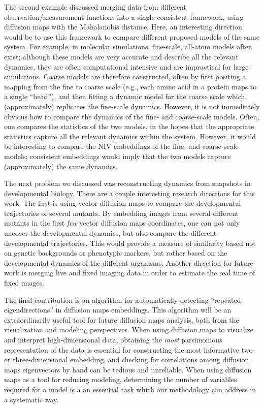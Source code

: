 The second example discussed merging data from different observation/measurement functions into a single consistent framework, using diffusion maps with the Mahalanobis distance. 
%
Here, an interesting direction would be to use this framework to compare different proposed models of the same system. 
%
For example, in molecular simulations, fine-scale, all-atom models often exist; although these models are very accurate and describe all the relevant dynamics, they are often computational intensive and are impractical for large simulations. 
%
Coarse models are therefore constructed, often by first positing a mapping from the fine to coarse scale (e.g., each amino acid in a protein maps to a single ``bead''), and then fitting a dynamic model for the coarse scale which (approximately) replicates the fine-scale dynamics. 
%
However, it is not immediately obvious how to compare the dynamics of the fine- and coarse-scale models. 
%
Often, one compares the statistics of the two models, in the hopes that the appropriate statistics capture all the relevant dynamics within the system.
%
However, it would be interesting to compare the NIV embeddings of the fine- and coarse-scale models; consistent embeddings would imply that the two models capture (approximately) the same dynamics. 

The next problem we discussed was reconstructing dynamics from snapshots in developmental biology. 
%
There are a couple interesting research directions for this work. 
%
The first is using vector diffusion maps to compare the developmental trajectories of several mutants. 
%
By embedding images from several different mutants in the first {\em few} vector diffusion maps coordinates, one can not only uncover the developmental dynamics, but also compare the different developmental trajectories. 
%
This would provide a measure of similarity based not on genetic backgrounds or phenotypic markers, but rather based on the developmental dynamics of the different organisms. 
%
Another direction for future work is merging live and fixed imaging data in order to estimate the real time of fixed images. 

The final contribution is an algorithm for automatically detecting ``repeated eigendirections'' in diffusion maps embeddings. 
%
This algorithm will be an extraordinarily useful tool for future diffusion maps analysis, both from the visualization and modeling perspectives. 
%
When using diffusion maps to visualize and interpret high-dimensional data, obtaining the {\em most} parsimonious representation of the data is essential for constructing the most informative two- or three-dimensional embedding, and checking for correlations among diffusion maps eigenvectors by hand can be tedious and unreliable. 
%
When using diffusion maps as a tool for reducing modeling, determining the number of variables required for a model is a an essential task which our methodology can address in a systematic way.
